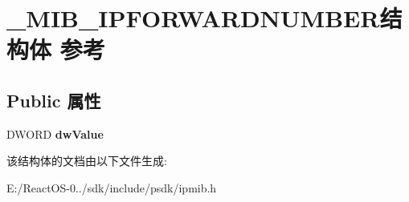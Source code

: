 \hypertarget{struct___m_i_b___i_p_f_o_r_w_a_r_d_n_u_m_b_e_r}{}\section{\+\_\+\+M\+I\+B\+\_\+\+I\+P\+F\+O\+R\+W\+A\+R\+D\+N\+U\+M\+B\+E\+R结构体 参考}
\label{struct___m_i_b___i_p_f_o_r_w_a_r_d_n_u_m_b_e_r}
\subsection*{Public 属性}
\begin{DoxyCompactItemize}
\item 
\mbox{\label{struct___m_i_b___i_p_f_o_r_w_a_r_d_n_u_m_b_e_r_aa4a76306b72b55cb076869a76461dc30}} 
D\+W\+O\+RD {\bfseries dw\+Value}
\end{DoxyCompactItemize}


该结构体的文档由以下文件生成\+:\begin{DoxyCompactItemize}
\item 
E\+:/\+React\+O\+S-\/0../sdk/include/psdk/ipmib.\+h\end{DoxyCompactItemize}
